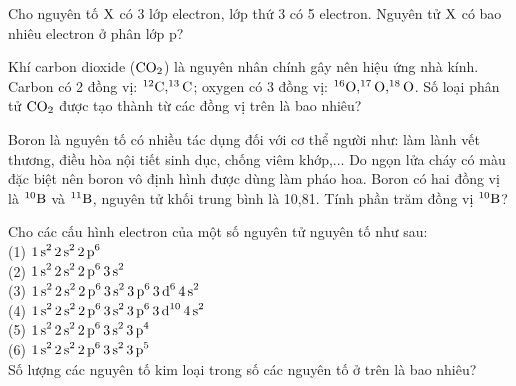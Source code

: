\documentclass[11pt,a4paper]{article}
\begin{document}
\begin{ex}
Cho nguyên tố $\ce{X}$ có 3 lớp electron, lớp thứ 3 có 5 electron. Nguyên tử $\ce{X}$ có bao nhiêu electron ở phân lớp p?

\end{ex}
\begin{ex}
Khí carbon dioxide ($\ce{CO2}$) là nguyên nhân chính gây nên hiệu ứng nhà kính. Carbon có 2 đồng vị: $^{12}\ce{C}, ^{13}\ce{C}$; oxygen có 3 đồng vị: $^{16}\ce{O}, ^{17}\ce{O}, ^{18}\ce{O}$. Số loại phân tử $\ce{CO2}$ được tạo thành từ các đồng vị trên là bao nhiêu?

\end{ex}
\begin{ex}
Boron là nguyên tố có nhiều tác dụng đối với cơ thể người như: làm lành vết thương, điều hòa nội tiết sinh dục, chống viêm khớp,... Do ngọn lửa cháy có màu đặc biệt nên boron vô định hình được dùng làm pháo hoa. Boron có hai đồng vị là $^{10}\ce{B}$ và $^{11}\ce{B}$, nguyên tử khối trung bình là 10,81. Tính phần trăm đồng vị $^{10}\ce{B}$?

\end{ex}
\begin{ex}
Cho các cấu hình electron của một số nguyên tử nguyên tố như sau:\\
(1) $\ce{1s^2 2s^2 2p^6}$\\
(2) $\ce{1s^2 2s^2 2p^6 3s^2}$\\
(3) $\ce{1s^2 2s^2 2p^6 3s^2 3p^6 3d^6 4s^2}$\\
(4) $\ce{1s^2 2s^2 2p^6 3s^2 3p^6 3d^{10} 4s^2}$\\
(5) $\ce{1s^2 2s^2 2p^6 3s^2 3p^4}$\\
(6) $\ce{1s^2 2s^2 2p^6 3s^2 3p^5}$\\
Số lượng các nguyên tố kim loại trong số các nguyên tố ở trên là bao nhiêu?

\end{ex}
\end{document}
